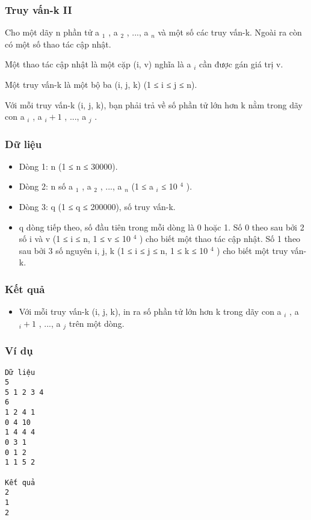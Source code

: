 



\subsubsection{   Truy vấn-k II  }

   Cho một dãy n phần tử a   $_    1   $   ,   a   $_    2   $   , ..., a   $_    n   $   và một số các truy vấn-k. Ngoài ra còn có một số thao tác cập nhật.  

   Một thao tác cập nhật là một cặp (i, v) nghĩa là a   $_    i   $   cần được gán giá trị v.  

   Một truy vấn-k là một bộ ba (i, j, k) (1 ≤ i ≤ j ≤ n).  

   Với mỗi truy vấn-k (i, j, k), bạn phải trả về số phần tử lớn hơn k nằm trong dãy con a   $_    i   $   ,   a   $_    i+1   $   , ..., a   $_    j   $   .  

\subsubsection{   Dữ liệu  }
\begin{itemize}
	\item     Dòng 1: n (1 ≤ n ≤ 30000).   
	\item     Dòng 2: n số a    $_     1    $    , a    $_     2    $    , ...,   a    $_     n    $    (1 ≤ a    $_     i    $    ≤   10    $^     4    $    ).   
	\item     Dòng 3: q (1 ≤ q ≤ 200000), số truy vấn-k.   
	\item     q dòng tiếp theo, số đầu tiên trong mỗi dòng là 0 hoặc 1. Số 0 theo sau bởi 2 số i và v (1 ≤ i ≤ n, 1 ≤ v ≤ 10    $^     4    $    ) cho biết một thao tác cập nhật. Số 1 theo sau bởi 3 số nguyên i, j, k (1 ≤ i ≤ j ≤ n, 1 ≤ k ≤ 10    $^     4    $    ) cho biết một truy vấn-k.   
\end{itemize}

\subsubsection{   Kết quả  }
\begin{itemize}
	\item     Với mỗi truy vấn-k (i, j, k), in ra số phần tử lớn hơn k trong dãy con a    $_     i    $    ,   a    $_     i+1    $    , ..., a    $_     j    $    trên một dòng.    


\end{itemize}

\subsubsection{   Ví dụ  }
\begin{verbatim}
Dữ liệu
5
5 1 2 3 4
6
1 2 4 1
0 4 10
1 4 4 4
0 3 1
0 1 2
1 1 5 2  

Kết quả
2
1
2 
\end{verbatim}